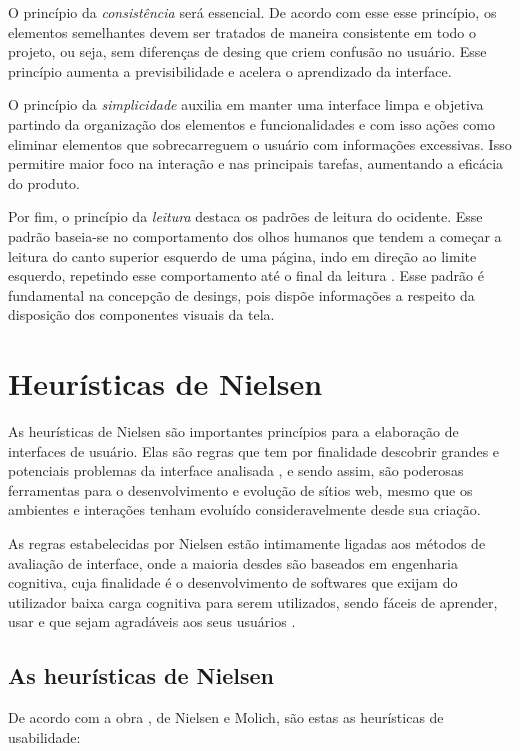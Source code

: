O princípio da \textit{consistência} será essencial. De acordo com esse esse princípio, os elementos semelhantes devem ser tratados de maneira consistente em todo o projeto, ou seja, sem diferenças de desing que criem confusão no usuário. Esse princípio aumenta a previsibilidade e acelera o aprendizado da interface.

O princípio da \textit{simplicidade} auxilia em manter uma interface limpa e objetiva partindo da organização dos elementos e funcionalidades e com isso ações como eliminar elementos que sobrecarreguem o usuário com informações excessivas. Isso permitire maior foco na interação e nas principais tarefas, aumentando a eficácia do produto.

Por fim, o princípio da \textit{leitura} destaca os padrões de leitura do ocidente. Esse padrão baseia-se no comportamento dos olhos humanos que tendem a começar a leitura do canto superior esquerdo de uma página, indo em direção ao limite esquerdo, repetindo esse comportamento até o final da leitura \cite{lidwell2010}. Esse padrão é fundamental na concepção de desings, pois dispõe informações a respeito da disposição dos componentes visuais da tela.

\section{Heurísticas de Nielsen}

As heurísticas de Nielsen são importantes princípios para a elaboração de interfaces de usuário. Elas são regras que tem por finalidade descobrir grandes e potenciais problemas da interface analisada \cite{nielsen1994usability}, e sendo assim, são poderosas ferramentas para o desenvolvimento e evolução de sítios web, mesmo que os ambientes e interações tenham evoluído consideravelmente desde sua criação.

As regras estabelecidas por Nielsen estão intimamente ligadas aos métodos de avaliação de interface, onde a maioria desdes são baseados em engenharia cognitiva, cuja finalidade é o desenvolvimento de softwares que exijam do utilizador baixa carga cognitiva para serem utilizados, sendo fáceis de aprender, usar e que sejam agradáveis aos seus usuários \cite{maciel2004avaliacao}.

\subsection{As heurísticas de Nielsen}

De acordo com a obra \cite{nielsen1994usability}, de Nielsen e Molich, são estas as heurísticas de usabilidade:

